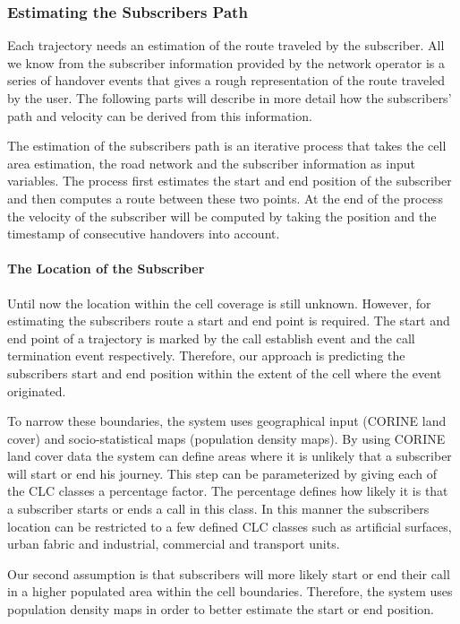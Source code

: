 \documentclass[twocolumn]{bmcart}%
\begin{document}
\subsubsection*{Estimating the Subscribers Path}
Each trajectory needs an estimation of the route traveled by the subscriber. All we know from the subscriber information provided by the network operator is a series of handover events that gives a rough representation of the route traveled by the user. The following parts will describe in more detail how the subscribers' path and velocity can be derived from this information.

The estimation of the subscribers path is an iterative process that takes the cell area estimation, the road network and the subscriber information as input variables. The process first estimates the start and end position of the subscriber and then computes a route between these two points. At the end of the process the velocity of the subscriber will be computed by taking the position and the timestamp of consecutive handovers into account.

\paragraph{The Location of the Subscriber}
Until now the location within the cell coverage is still unknown. However, for estimating the subscribers route a start and end point is required. The start and end point of a trajectory is marked by the call establish event and the call termination event respectively. Therefore, our approach is predicting the subscribers start and end position within the extent of the cell where the event originated. 

To narrow these boundaries, the system uses geographical input (CORINE
land cover) and socio-statistical maps (population density maps).
By using CORINE land cover data the system can define areas where
it is unlikely that a subscriber will start or end his journey. This step can be
parameterized by giving each of the CLC classes a percentage factor. The
percentage defines how likely it is that a subscriber starts or ends a call in
this class. In this manner the subscribers location can be restricted to a few defined CLC classes such as 	artificial surfaces, urban fabric and industrial, commercial and transport units. 

Our second assumption is that subscribers will more likely start or end
their call in a higher populated area within the cell boundaries. Therefore,
the system uses population density maps in order to better estimate the
start or end position.
\end{document}
